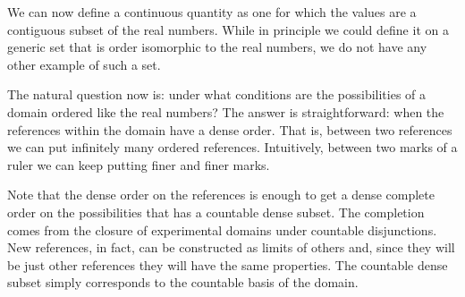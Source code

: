 We can now define a continuous quantity as one for which the values are a contiguous subset of the real numbers. While in principle we could define it on a generic set that is order isomorphic to the real numbers, we do not have any other example of such a set.

The natural question now is: under what conditions are the possibilities of a domain ordered like the real numbers? The answer is straightforward: when the references within the domain have a dense order. That is, between two references we can put infinitely many ordered references. Intuitively, between two marks of a ruler we can keep putting finer and finer marks.

Note that the dense order on the references is enough to get a dense complete order on the possibilities that has a countable dense subset. The completion comes from the closure of experimental domains under countable disjunctions. New references, in fact, can be constructed as limits of others and, since they will be just other references they will have the same properties. The countable dense subset simply corresponds to the countable basis of the domain.

